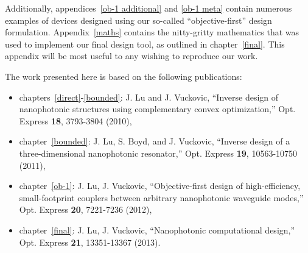 Additionally, appendices~\ref{ob-1 additional} and \ref{ob-1 meta} 
    contain numerous examples of devices designed using our
    so-called ``objective-first'' design formulation.
Appendix~\ref{maths} contains the nitty-gritty mathematics
    that was used to implement our final design tool, 
    as outlined in chapter~\ref{final}.
This appendix will be most useful to any wishing to reproduce our work.

The work presented here is based on the following publications:
\begin{itemize}
\item chapters~\ref{direct}-\ref{bounded}: J. Lu and J. Vuckovic, ``Inverse design of nanophotonic structures using complementary convex optimization,'' Opt. Express \textbf{18}, 3793-3804 (2010),
\item chapter~\ref{bounded}: J. Lu, S. Boyd, and J. Vuckovic, 
    ``Inverse design of a three-dimensional nanophotonic resonator,''
    Opt. Express \textbf{19}, 10563-10750 (2011),
\item chapter~\ref{ob-1}: J. Lu, J. Vuckovic, ``Objective-first design of high-efficiency, small-footprint couplers between arbitrary nanophotonic waveguide modes,'' 
    Opt. Express \textbf{20}, 7221-7236 (2012),
\item chapter~\ref{final}: J. Lu, J. Vuckovic, ``Nanophotonic computational design,'' 
    Opt. Express \textbf{21}, 13351-13367 (2013).
\end{itemize}
